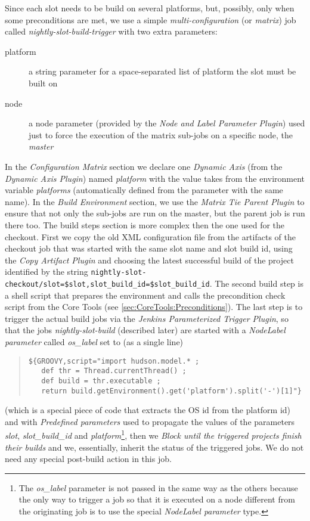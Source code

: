 Since each slot needs to be build on several platforms, but, possibly, only when
some preconditions are met, we use a simple \emph{multi-configuration} (or
\emph{matrix}) job called \emph{nightly-slot-build-trigger} with two extra
parameters:
\begin{description}
  \item[platform] a string parameter for a space-separated list of platform the
slot must be built on
  \item[node] a node parameter (provided by the \emph{Node and Label Parameter
Plugin}) used just to force the execution of the matrix sub-jobs on a specific
node, the \emph{master}
\end{description}
In the \emph{Configuration Matrix} section we declare one \emph{Dynamic Axis}
(from the \emph{Dynamic Axis Plugin}) named \emph{platform} with the value takes
from the environment variable \emph{platforms} (automatically defined from the
parameter with the same name).  In the \emph{Build Environment} section, we use
the \emph{Matrix Tie Parent Plugin} to ensure that not only the sub-jobs are run
on the master, but the parent job is run there too.  The build steps section is
more complex then the one used for the checkout.  First we copy the old XML
configuration file from the artifacts of the checkout job that was started with
the same slot name and slot build id, using the \emph{Copy Artifact Plugin} and
choosing the latest successful build of the project identified by the string
\verb|nightly-slot-checkout/slot=$slot,slot_build_id=$slot_build_id|.  The
second build step is a shell script that prepares the environment and calls the
precondition check script from the Core Tools (see
\ref{sec:CoreTools:Preconditions}).  The last step is to trigger the actual
build
jobs via the \emph{Jenkins Parameterized Trigger Plugin}, so that the jobs
\emph{nightly-slot-build} (described later) are started with a \emph{NodeLabel
parameter} called \emph{os\_label} set to (as a single line)
\begin{quote}
\begin{verbatim}
${GROOVY,script="import hudson.model.* ;
   def thr = Thread.currentThread() ;
   def build = thr.executable ;
   return build.getEnvironment().get('platform').split('-')[1]"}
\end{verbatim}
\end{quote} (which is a special piece of code that extracts the OS id from the
platform id)
and with \emph{Predefined parameters} used to propagate the values of the
parameters \emph{slot}, \emph{slot\_build\_id} and \emph{platform}\footnote{The
  \emph{os\_label} parameter is not passed in the same way as the others because
  the only way to trigger a job so that it is executed on a node different from
  the originating job is to use the special \emph{NodeLabel parameter} type.},
then we \emph{Block until the triggered projects finish their builds} and we,
essentially, inherit the status of the triggered jobs.  We do not need any
special post-build action in this job.

